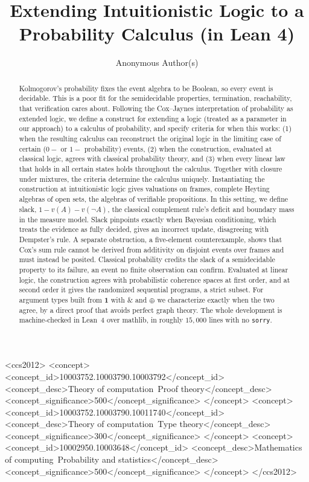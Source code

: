 \documentclass[sigplan,10pt,review,anonymous]{acmart}
\theoremstyle{plain}
\theoremstyle{definition}
\theoremstyle{remark}
\begin{document}
\title{Extending Intuitionistic Logic to a Probability Calculus (in Lean 4)}

\author{Anonymous Author(s)}

\begin{abstract}
Kolmogorov's probability fixes the event algebra to be Boolean, so
every event is decidable.
This is a poor fit for the semidecidable properties, termination,
reachability, that verification cares about. 
Following the Cox--Jaynes interpretation of probability as extended logic,
we define a construct for extending a logic (treated as a parameter in 
our approach) to a calculus of probability, 
and specify criteria for when this works: (1) when the resulting calculus 
can reconstruct the original logic in the limiting case of certain 
($0-$ or $1-$ probability) events, (2) when the construction, evaluated 
at classical logic, agrees with classical probability theory, and
(3) when every linear law that holds in all certain states holds
throughout the calculus. Together with closure under mixtures, the
criteria determine the calculus uniquely.
Instantiating the construction at intuitionistic logic gives valuations
on frames, complete Heyting algebras of open sets, the algebras of
verifiable propositions. In this setting,
we define slack, $1 - v(A) - v(\neg A)$, the classical complement
rule's deficit and boundary mass in the measure model.  Slack
pinpoints exactly when Bayesian conditioning, which treats the
evidence as fully decided, gives an incorrect update, disagreeing
with Dempster's rule.
A separate obstruction, a five-element counterexample, shows that Cox's
sum rule cannot be derived from additivity on disjoint events over
frames and must instead be posited.
Classical probability credits the slack of a semidecidable property
to its failure, an event no finite observation can confirm.
Evaluated at linear logic, the construction agrees with probabilistic
coherence spaces at first order, and at second order it gives the
randomized sequential programs, a strict subset. For argument types built
from $\mathbf{1}$ with $\mathbin{\&}$ and $\oplus$ we characterize exactly
when the two agree, by a direct proof that avoids perfect graph theory.
The whole development is machine-checked in Lean~4 over \textsf{mathlib},
in roughly $15{,}000$ lines with no \texttt{sorry}.
\end{abstract}

\begin{CCSXML}
<ccs2012>
<concept>
<concept_id>10003752.10003790.10003792</concept_id>
<concept_desc>Theory of computation~Proof theory</concept_desc>
<concept_significance>500</concept_significance>
</concept>
<concept>
<concept_id>10003752.10003790.10011740</concept_id>
<concept_desc>Theory of computation~Type theory</concept_desc>
<concept_significance>300</concept_significance>
</concept>
<concept>
<concept_id>10002950.10003648</concept_id>
<concept_desc>Mathematics of computing~Probability and statistics</concept_desc>
<concept_significance>500</concept_significance>
</concept>
</ccs2012>
\end{CCSXML}
\end{document}
